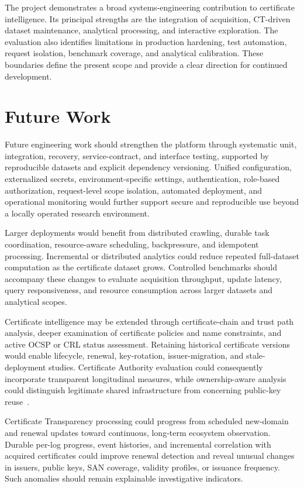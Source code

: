 The project demonstrates a broad systems-engineering contribution to
certificate intelligence. Its principal strengths are the integration of
acquisition, CT-driven dataset maintenance, analytical processing, and
interactive exploration. The evaluation also identifies limitations in
production hardening, test automation, request isolation, benchmark coverage,
and analytical calibration. These boundaries define the present scope and
provide a clear direction for continued development.

\section{Future Work}
\label{sec:future-work}

Future engineering work should strengthen the platform through systematic
unit, integration, recovery, service-contract, and interface testing, supported
by reproducible datasets and explicit dependency versioning. Unified
configuration, externalized secrets, environment-specific settings,
authentication, role-based authorization, request-level scope isolation,
automated deployment, and operational monitoring would further support secure
and reproducible use beyond a locally operated research environment.

Larger deployments would benefit from distributed crawling, durable task
coordination, resource-aware scheduling, backpressure, and idempotent
processing. Incremental or distributed analytics could reduce repeated
full-dataset computation as the certificate dataset grows. Controlled
benchmarks should accompany these changes to evaluate acquisition throughput,
update latency, query responsiveness, and resource consumption across larger
datasets and analytical scopes.

Certificate intelligence may be extended through certificate-chain and trust
path analysis, deeper examination of certificate policies and name constraints,
and active OCSP or CRL status assessment. Retaining historical certificate
versions would enable lifecycle, renewal, key-rotation, issuer-migration, and
stale-deployment studies. Certificate Authority evaluation could consequently
incorporate transparent longitudinal measures, while ownership-aware analysis
could distinguish legitimate shared infrastructure from concerning public-key
reuse~\cite{junaid2025shared}.

Certificate Transparency processing could progress from scheduled new-domain
and renewal updates toward continuous, long-term ecosystem observation.
Durable per-log progress, event histories, and incremental correlation with
acquired certificates could improve renewal detection and reveal unusual
changes in issuers, public keys, SAN coverage, validity profiles, or issuance
frequency. Such anomalies should remain explainable investigative indicators.

